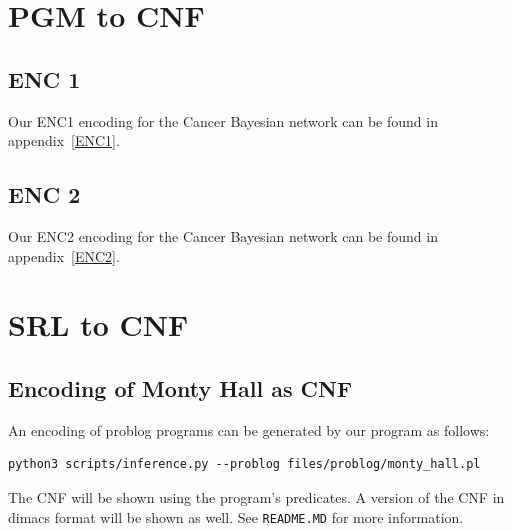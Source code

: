 \section{PGM to CNF}

\subsection{ENC 1}
Our ENC1 encoding for the Cancer Bayesian network can be found in appendix~\ref{ENC1}.

\subsection{ENC 2}
Our ENC2 encoding for the Cancer Bayesian network can be found in appendix~\ref{ENC2}.



\section{SRL to CNF}
\subsection{Encoding of Monty Hall as CNF}
An encoding of problog programs can be generated by our program as follows:
\begin{lstlisting}
python3 scripts/inference.py --problog files/problog/monty_hall.pl
\end{lstlisting}
The CNF will be shown using the program's predicates. A version of the CNF in dimacs format will be shown as well.
See \texttt{README.MD} for more information.

